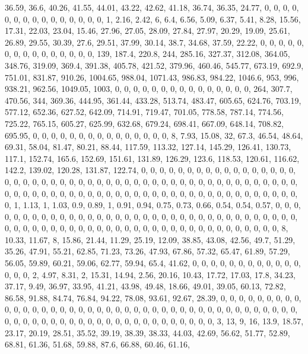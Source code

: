 \documentclass[
]{article}
\begin{document}
36.59, 36.6, 40.26, 41.55, 44.01, 43.22, 42.62, 41.18, 36.74, 36.35,
24.77, 0, 0, 0, 0, 0, 0, 0, 0, 0, 0, 0, 0, 0, 0, 0, 1, 2.16, 2.42, 6,
6.4, 6.56, 5.09, 6.37, 5.41, 8.28, 15.56, 17.31, 22.03, 23.04, 15.46,
27.96, 27.05, 28.09, 27.84, 27.97, 20.29, 19.09, 25.61, 26.89, 29.55,
30.39, 27.6, 29.51, 37.99, 30.14, 38.7, 34.68, 37.59, 22.22, 0, 0, 0, 0,
0, 0, 0, 0, 0, 0, 0, 0, 0, 0, 0, 139, 187.4, 220.8, 244, 285.16, 327.37,
312.08, 364.05, 348.76, 319.09, 369.4, 391.38, 405.78, 421.52, 379.96,
460.46, 545.77, 673.19, 692.9, 751.01, 831.87, 910.26, 1004.65, 988.04,
1071.43, 986.83, 984.22, 1046.6, 953, 996, 938.21, 962.56, 1049.05,
1003, 0, 0, 0, 0, 0, 0, 0, 0, 0, 0, 0, 0, 0, 0, 0, 264, 307.7, 470.56,
344, 369.36, 444.95, 361.44, 433.28, 513.74, 483.47, 605.65, 624.76,
703.19, 577.12, 652.36, 627.52, 642.09, 714.91, 719.47, 701.05, 778.58,
787.14, 774.56, 725.22, 765.15, 605.27, 625.99, 632.68, 679.24, 698.41,
667.09, 648.14, 708.82, 695.95, 0, 0, 0, 0, 0, 0, 0, 0, 0, 0, 0, 0, 0,
0, 0, 8, 7.93, 15.08, 32, 67.3, 46.54, 48.64, 69.31, 58.04, 81.47,
80.21, 88.44, 117.59, 113.32, 127.14, 145.29, 126.41, 130.73, 117.1,
152.74, 165.6, 152.69, 151.61, 131.89, 126.29, 123.6, 118.53, 120.61,
116.62, 142.2, 139.02, 120.28, 131.87, 122.74, 0, 0, 0, 0, 0, 0, 0, 0,
0, 0, 0, 0, 0, 0, 0, 0, 0, 0, 0, 0, 0, 0, 0, 0, 0, 0, 0, 0, 0, 0, 0, 0,
0, 0, 0, 0, 0, 0, 0, 0, 0, 0, 0, 0, 0, 0, 0, 0, 0, 0, 0, 0, 0, 0, 0, 0,
0, 0, 0, 0, 0, 0, 0, 0, 0, 0, 0, 0, 0, 0, 0, 0, 0, 0, 0, 0, 0, 0, 0, 0,
0, 0, 1, 1.13, 1, 1.03, 0.9, 0.89, 1, 0.91, 0.94, 0.75, 0.73, 0.66,
0.54, 0.54, 0.57, 0, 0, 0, 0, 0, 0, 0, 0, 0, 0, 0, 0, 0, 0, 0, 0, 0, 0,
0, 0, 0, 0, 0, 0, 0, 0, 0, 0, 0, 0, 0, 0, 0, 0, 0, 0, 0, 0, 0, 0, 0, 0,
0, 0, 0, 0, 0, 0, 0, 0, 0, 0, 0, 0, 0, 0, 0, 0, 0, 0, 0, 0, 0, 0, 0, 8,
10.33, 11.67, 8, 15.86, 21.44, 11.29, 25.19, 12.09, 38.85, 43.08, 42.56,
49.7, 51.29, 35.26, 47.91, 55.21, 62.85, 71.23, 73.26, 47.93, 67.86,
57.32, 65.47, 61.89, 57.29, 56.05, 59.89, 60.21, 59.06, 62.77, 59.94,
65.4, 41.62, 0, 0, 0, 0, 0, 0, 0, 0, 0, 0, 0, 0, 0, 0, 0, 2, 4.97, 8.31,
2, 15.31, 14.94, 2.56, 20.16, 10.43, 17.72, 17.03, 17.8, 34.23, 37.17,
9.49, 36.97, 33.95, 41.21, 43.98, 49.48, 18.66, 49.01, 39.05, 60.13,
72.82, 86.58, 91.88, 84.74, 76.84, 94.22, 78.08, 93.61, 92.67, 28.39, 0,
0, 0, 0, 0, 0, 0, 0, 0, 0, 0, 0, 0, 0, 0, 0, 0, 0, 0, 0, 0, 0, 0, 0, 0,
0, 0, 0, 0, 0, 0, 0, 0, 0, 0, 0, 0, 0, 0, 0, 0, 0, 0, 0, 0, 0, 0, 0, 0,
0, 0, 0, 0, 0, 0, 0, 0, 0, 0, 0, 0, 0, 0, 0, 3, 13, 9, 16, 13.9, 18.57,
23.17, 20.19, 28.51, 35.52, 39.19, 38.39, 38.33, 44.03, 42.69, 56.62,
51.77, 52.89, 68.81, 61.36, 51.68, 59.88, 87.6, 66.88, 60.46, 61.16,
\end{document}
